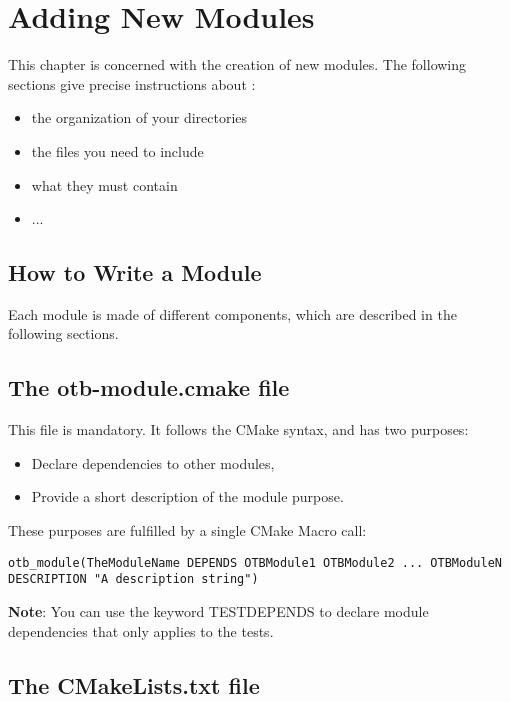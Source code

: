 \chapter{Adding New Modules}
\label{chapter:newModules}

This chapter is concerned with the creation of new modules. 
The following sections give precise instructions about :
\begin{itemize}
	\item the organization of your directories
	\item the files you need to include
	\item what they must contain
	\item ...
\end{itemize}

\section{How to Write a Module}
\label{sec:writemodule}

Each module is made of different components, which are described in the following sections.

\section{The otb-module.cmake file}

This file is mandatory. It follows the CMake syntax, and has two purposes: 

\begin{itemize}
       \item Declare dependencies to other modules, 
       \item Provide a short description of the module purpose. 
\end{itemize}

These purposes are fulfilled by a single CMake Macro call: 

\begin{verbatim}
otb_module(TheModuleName DEPENDS OTBModule1 OTBModule2 ... OTBModuleN DESCRIPTION "A description string")
\end{verbatim}

\textbf{Note}: You can use the keyword TEST\textunderscore DEPENDS to declare module dependencies that only applies to the tests.

\section{The CMakeLists.txt file}

